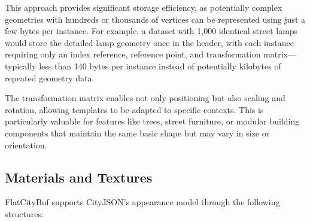 This approach provides significant storage efficiency, as potentially complex geometries with hundreds or thousands of vertices can be represented using just a few bytes per instance. For example, a dataset with 1,000 identical street lamps would store the detailed lamp geometry once in the header, with each instance requiring only an index reference, reference point, and transformation matrix—typically less than 140 bytes per instance instead of potentially kilobytes of repeated geometry data.

The transformation matrix enables not only positioning but also scaling and rotation, allowing templates to be adapted to specific contexts. This is particularly valuable for features like trees, street furniture, or modular building components that maintain the same basic shape but may vary in size or orientation.

\subsection{Materials and Textures}
\label{methodology:feature_encoding:materials_textures}

FlatCityBuf supports CityJSON's appearance model through the following structures:

